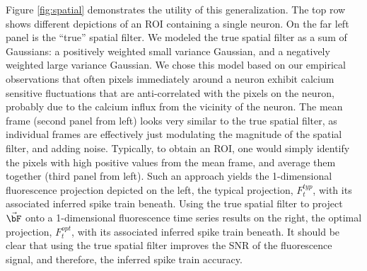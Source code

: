 Figure \ref{fig:spatial} demonstrates the utility of this generalization.  The top row shows different depictions of an ROI containing a single neuron.  On the far left panel is the ``true'' spatial filter.  We modeled the true spatial filter as a sum of Gaussians: a positively weighted small variance Gaussian, and a negatively weighted large variance Gaussian.  We chose this model based on our empirical observations that often pixels immediately around a neuron exhibit calcium sensitive fluctuations that are anti-correlated with the pixels on the neuron, probably due to the calcium influx from the vicinity of the neuron. The mean frame (second panel from left) looks very similar to the true spatial filter, as individual frames are effectively just modulating the magnitude of the spatial filter, and adding noise.  Typically, to obtain an ROI, one would simply identify the pixels with high positive values from the mean frame, and average them together (third panel from left).  Such an approach yields the 1-dimensional fluorescence projection depicted on the left, the typical projection, $F_t^{typ}$, with its associated inferred spike train beneath.  Using the true spatial filter to project $\vec{\bF}$ onto a 1-dimensional fluorescence time series results on the right, the optimal projection, $F_t^{opt}$, with its associated inferred spike train beneath.  It should be clear that using the true spatial filter improves the SNR of the fluorescence signal, and therefore, the inferred spike train accuracy.


